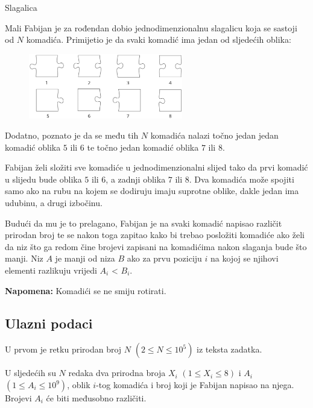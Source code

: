 \begin{statement}[
  problempoints=70,
  timelimit=1 sekunda,
  memorylimit=512 MiB,
]{Slagalica}

Mali Fabijan je za rođendan dobio jednodimenzionalnu slagalicu koja se sastoji
od $N$ komadića. Primijetio je da svaki komadić ima jedan od sljedećih oblika:

\begin{figure}[H]
\centering
\includegraphics[width=0.6\textwidth]{img/puzzledef.png}
\end{figure}

Dodatno, poznato je da se među tih $N$ komadića nalazi točno jedan jedan komadić
oblika $5$ ili $6$ te točno jedan komadić oblika $7$ ili $8$.

Fabijan želi složiti sve komadiće u jednodimenzionalni slijed tako da prvi
komadić u slijedu bude oblika $5$ ili $6$, a zadnji oblika $7$ ili $8$.
Dva komadića može spojiti samo ako na rubu na kojem se dodiruju imaju suprotne
oblike, dakle jedan ima udubinu, a drugi izbočinu.

Budući da mu je to prelagano, Fabijan je na svaki komadić napisao različit
prirodan broj te se nakon toga zapitao kako bi trebao posložiti komadiće ako
želi da niz što ga redom čine brojevi zapisani na komadićima nakon slaganja bude
što manji. Niz $A$ je manji od niza $B$ ako za prvu poziciju $i$ na kojoj se
njihovi elementi razlikuju vrijedi $A_i$ < $B_i$.

\textbf{Napomena:} Komadići se ne smiju rotirati.

\subsection*{Ulazni podaci}
U prvom je retku prirodan broj $N$ $(2 \le N \le 10^5)$ iz teksta zadatka.

U sljedećih su $N$ redaka dva prirodna broja $X_i$ $(1 \le X_i \le 8)$ i $A_i$
$(1 \le A_i \le 10^9)$, oblik $i$-tog komadića i broj koji je Fabijan napisao na
njega. Brojevi $A_i$ će biti međusobno različiti.


\end{statement}
